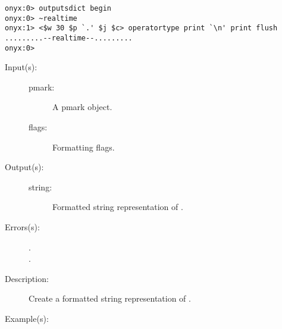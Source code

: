 \begin{description}
\begin{description}
\begin{verbatim}
onyx:0> outputsdict begin
onyx:0> ~realtime
onyx:1> <$w 30 $p `.' $j $c> operatortype print `\n' print flush
.........--realtime--.........
onyx:0>
		\end{verbatim}
	\end{description}
\label{outputsdict:pmarktype}
\item[{\onyxop{pmark flags}{pmarktype}{string}}: ]
	\begin{description}\item[]
	\item[Input(s): ]
		\begin{description}\item[]
		\item[pmark: ]
			A pmark object.
		\item[flags: ]
			Formatting flags.
		\end{description}
	\item[Output(s): ]
		\begin{description}\item[]
		\item[string: ]
			Formatted string representation of .
		\end{description}
	\item[Errors(s): ]
		\begin{description}\item[]
		\item[.]
		\item[.]
		\end{description}
	\item[Description: ]
		Create a formatted string representation of .
	\item[Example(s): ]\begin{verbatim}


\end{verbatim}
\end{description}
\end{description}
